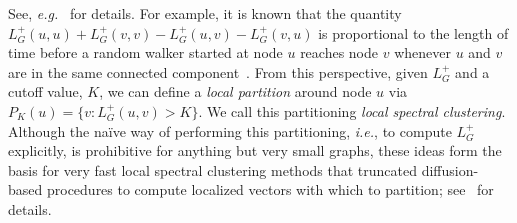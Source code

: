 \documentclass[12pt]{article}
\theoremstyle{plain}
\begin{document}
See, \emph{e.g.}~\cite{chebotarev1998proximity} for details.  
For example, 
it is known that the
quantity $L_G^{+} (u,u) + L_G^{+} (v,v) - L_G^{+} (u,v) - L_G^{+} (v,u)$ is
proportional to the length of time before a random walker started at
node $u$ reaches node $v$ whenever $u$ and $v$ are in the same
connected component~\cite{chandra1989electrical}.  
From this perspective, given $L_G^{+}$ and a cutoff value, $K$, we can 
define a \emph{local partition} around node $u$ via 
$P_K(u) = \{ v : L_G^{+}(u,v) > K \}$.  
We call this partitioning \emph{local spectral clustering}.
Although the na\"{i}ve way of performing this partitioning, \emph{i.e.}, to 
compute $L_G^{+}$ explicitly, is prohibitive for anything but very small 
graphs, these ideas form the basis for very fast local spectral clustering 
methods that truncated diffusion-based procedures to compute localized 
vectors with which to partition; 
see~\cite{Spielman:2004,andersen06local,Chung07_heatkernelPNAS,MOV09_TRv2} 
for details.
\end{document}
